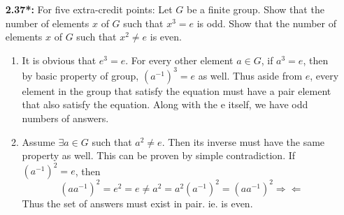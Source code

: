 \documentclass[11pt, oneside]{article}
\begin{document}
\begin{enumerate}
\begin{enumerate}
\begin{proof}
\end{proof}
\end{enumerate}  


\item[{\bf 2.37*:}] For five extra-credit points: Let $G$ be a finite group. Show that the number of elements $x$ of $G$ such that $x^3=e$ is odd. Show that the number of elements $x$ of $G$ such that $x^2\neq e$ is even.\\

\begin{enumerate}
    \item It is obvious that $e^3=e$. For every other element $a\in G$, if $a^3=e$, then by basic property of group, $(a^{-1})^3=e $ as well. Thus aside from $e$, every element in the group that satisfy the equation must have a pair element that also satisfy the equation. Along with the e itself, we have odd numbers of answers. 
    \item Assume $\exists a\in G$ such that $a^2\neq e$. Then its inverse must have the same property as well. This can be proven by simple contradiction. If $(a^{-1})^2=e$, then 
    \[(aa^{-1})^2=e^2=e\neq a^2=a^2(a^{-1})^2=(aa^{-1})^2 \Rightarrow\Leftarrow\]
    Thus the set of answers must exist in pair. ie. is even.
\end{enumerate}



\end{enumerate}
\end{document}
